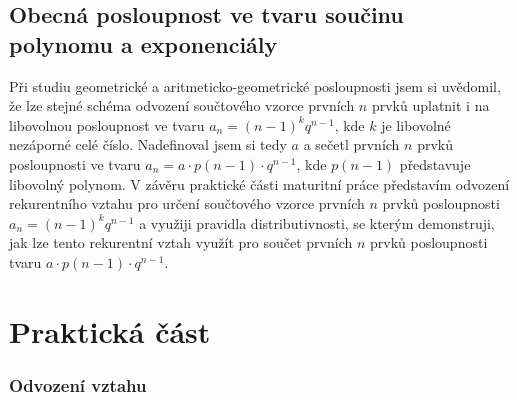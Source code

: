 \documentclass[12pt]{report}			%
\begin{document}
\chapter{Obecná posloupnost ve tvaru součinu \\ polynomu a exponenciály}
Při studiu geometrické a aritmeticko-geometrické posloupnosti jsem si uvědomil, že lze stejné schéma odvození součtového vzorce prvních $n$ prvků uplatnit i na libovolnou posloupnost ve tvaru $a_n = (n-1)^kq^{n-1}$, kde $k$ je libovolné nezáporné celé číslo. Nadefinoval jsem si tedy $a$ a sečetl prvních $n$ prvků posloupnosti ve tvaru $a_n = a\cdot p(n-1)\cdot q^{n-1}$, kde $p(n-1)$ představuje libovolný polynom. V závěru praktické části maturitní práce představím odvození rekurentního vztahu pro určení součtového vzorce prvních $n$ prvků posloupnosti $a_n = (n-1)^kq^{n-1}$ a využiji pravidla distributivnosti, se kterým demonstruji, jak lze tento rekurentní vztah využít pro součet prvních $n$ prvků posloupnosti tvaru $a\cdot p(n-1)\cdot q^{n-1}$.
\part{Praktická část}
\section*{Odvození vztahu}
\end{document}
